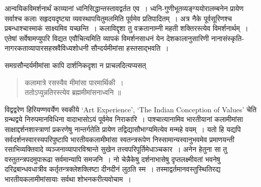 \eject

{\dev आन्वयिकविमर्शनार्थं काव्यानां ध्वनिसिद्धान्तस्तावद्वर्तत एव~। ध्वनि-गुणीभूतव्यङ्ग्ययो\-रालम्ब\-नेन प्रायेण सर्वाश्च कलाः सहृदयदृष्ट्या व्यवस्थापयितुमलमिति पूर्वमेव प्रतिपादितम्~। अत्र नैके पूर्वसूरिणश्च प्रबन्धाश्चास्माकं साक्ष्यमिव यच्छन्ति~। कलाविद्दृशा तु वक्रतानाम्नी महती शक्तिरस्त्येव विमर्शनार्थम्~। एतेषां सर्वेषामप्युपरि विद्यत एवौचित्यमिति व्यापकं विमर्शन\-साधनं येन देशकालानुसारिणी नानासंस्कृति-नागरकताव्यापारसहस्रवैविध्यशोधनी सौन्दर्य\-मीमांसा हस्तसाद्भवति~।}

{\dev समग्रसौन्दर्यमीमांसा कापि दार्शनिकदृशा न प्राचलदित्यप्यसत्}
\begin{quote}
{\dev कलामात्रे रसस्यैव मीमांसा पारमार्थिकी~।}\\
{\dev ततोऽप्युन्नतिरस्त्येव ब्रह्ममीमांसनाध्वनि ॥}
\end{quote}

{\dev विद्वद्वरेण हिरियण्णवर्येण स्वकीये} `Art Experience', `The Indian Conception of Values' {\dev चेति ग्रन्थद्वये निरुपमानविधिना वादाभासोऽयं पूर्वमेव निराकारि~। पाश्चात्यानामिव भारतीयानां कलामीमांसा साक्षाद्दर्शनशास्त्राणां प्रकरणेषु नान्तर्गतेति प्रायेण तद्विद्यासौभाग्य\-मित्येव मन्महे वयम्~। यतो हि यद्यपि सर्वदर्शनस्वारस्यपरिपुष्टापि भारतीयकलामीमांसा स्वतन्त्ररूपेण निस्सामान्यस्वानुभवमेव  प्रमाणयन्ती रसाभिव्यक्तिवादे व्यञ्जनाव्यापारविश्रान्ते सुखेन तत्त्वपरिपूर्तिमेधाञ्चकार~। अनेन हेतुना सा तु वस्तुतन्त्रपदमुपारूढा सर्वमान्यापि सम\-जनि~। नो चेन्नैकेषु दर्शनाभासेषु दृप्तलक्ष्मीवतां भवनेषु दरिद्रबान्धवधात्रीव कर्तृतन्त्रक्लेशक्लिष्टा दीनदीनं लुठति स्म~। तस्माद्वर्तमानवस्तुस्थितिरद्य भारतीयकलामीमांसायाः सर्वथा शोभन\-करीत्यवोचाम~।}

